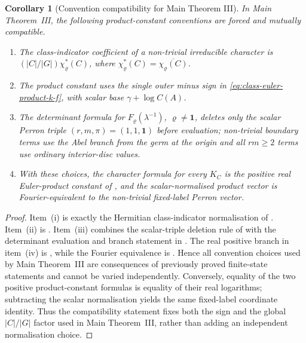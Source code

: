 \documentclass[11pt,a4paper]{amsart}
\theoremstyle{plain}
\newtheorem{corollary}[theorem]{Corollary}
\theoremstyle{definition}
\theoremstyle{remark}
\begin{document}
\begin{corollary}[Convention compatibility for Main Theorem III]\label{cor:main-iii-convention-compatibility}
  In Main Theorem~III, the following product-constant conventions are forced
  and mutually compatible.
  \begin{enumerate}[label=\textup{(\roman*)},leftmargin=*]
    \item The class-indicator coefficient of a non-trivial irreducible
    character is \((|C|/|G|)\chi_\varrho^\ast(C)\), where
    \(\chi_\varrho^\ast(C)=\overline{\chi_\varrho(C)}\).
    \item The product constant uses the single outer minus sign in
    \eqref{eq:class-euler-product-k-f}, with scalar base
    \(\gamma+\log C(A)\).
    \item The determinant formula for
    \(F_\varrho(\lambda^{-1})\), \(\varrho\ne\mathbf1\), deletes only the
    scalar Perron triple \((r,m,\pi)=(1,1,\mathbf1)\) before evaluation;
    non-trivial boundary terms use the Abel branch from the germ at the
    origin and all \(rm\ge2\) terms use ordinary interior-disc values.
    \item With these choices, the character formula for every \(K_C\) is the
    positive real Euler-product constant of ,
    and the scalar-normalised product vector is Fourier-equivalent to the
    non-trivial fixed-label Perron vector.
  \end{enumerate}
\end{corollary}

\begin{proof}
  Item~\textup{(i)} is exactly the Hermitian class-indicator normalisation of
  .  Item~\textup{(ii)} is
  .  Item~\textup{(iii)}
  combines the scalar-triple deletion rule of
   with the determinant
  evaluation and branch statement in .
  The real positive branch in item~\textup{(iv)} is
  , while the Fourier equivalence
  is .
  Hence all convention choices used by Main Theorem~III are consequences of
  previously proved finite-state statements and cannot be varied independently.
  Conversely, equality of the two positive product-constant formulas is
  equality of their real logarithms; subtracting the scalar normalisation
  yields the same fixed-label coordinate identity.  Thus the compatibility
  statement fixes both the sign and the global \(|C|/|G|\) factor used in Main
  Theorem~III, rather than adding an independent normalisation choice.
\end{proof}
\end{document}
